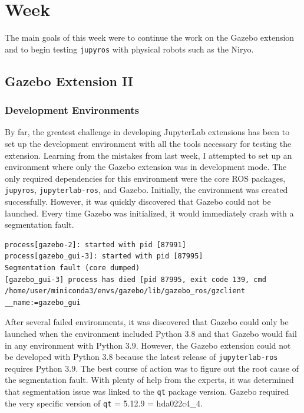 \chapter{Week}

    The main goals of this week were to continue the work on the Gazebo extension and to begin testing \texttt{jupyros} with physical robots such as the Niryo.

\section{Gazebo Extension II}

    \subsection{Development Environments}
    
    By far, the greatest challenge in developing JupyterLab extensions has been to set up the development environment with all the tools necessary for testing the extension. Learning from the mistakes from last week, I attempted to set up an environment where only the Gazebo extension was in development mode. The only required dependencies for this environment were the core ROS packages, \texttt{jupyros}, \texttt{jupyterlab-ros}, and Gazebo. Initially, the environment was created successfully. However, it was quickly discovered that Gazebo could not be launched. Every time Gazebo was initialized, it would immediately crash with a segmentation fault.
    
    \begin{lstlisting}[language=error]
process[gazebo-2]: started with pid [87991]          
process[gazebo_gui-3]: started with pid [87995] 
Segmentation fault (core dumped)
[gazebo_gui-3] process has died [pid 87995, exit code 139, cmd /home/user/miniconda3/envs/gazebo/lib/gazebo_ros/gzclient __name:=gazebo_gui 
    \end{lstlisting}
    
    After several failed environments, it was discovered that Gazebo could only be launched when the environment included Python $3.8$ and that Gazebo would fail in any environment with Python $3.9$. However, the Gazebo extension could not be developed with Python $3.8$ because the latest release of \texttt{jupyterlab-ros} requires Python $3.9$. The best course of action was to figure out the root cause of the segmentation fault. With plenty of help from the experts, it was determined that segmentation issue was linked to the \texttt{qt} package version. Gazebo required the very specific version of \texttt{qt} = 5.12.9 = hda022c4\_4. 
    
